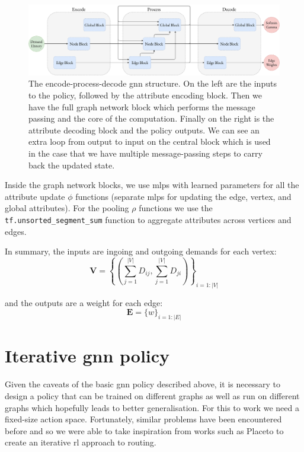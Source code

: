 \begin{figure}
    \centering
    \includegraphics[width=\textwidth]{figures/encode_process_decode.pdf}
    \caption{The encode-process-decode \ac{gnn} structure. On the left are the inputs to the policy, followed by the attribute encoding block. Then we have the full graph network block which performs the message passing and the core of the computation. Finally on the right is the attribute decoding block and the policy outputs. We can see an extra loop from output to input on the central block which is used in the case that we have multiple message-passing steps to carry back the updated state.}
    \label{fig:encode_process_decode}
\end{figure}

Inside the graph network blocks, we use \acp{mlp} with learned parameters for all the attribute update $\phi$ functions (separate \acp{mlp} for updating the edge, vertex, and global attributes). For the pooling $\rho$ functions we use the \texttt{tf.unsorted\_segment\_sum} function to aggregate attributes across vertices and edges.

In summary, the inputs are ingoing and outgoing demands for each vertex:
\begin{equation}
  \label{equation:node_inputs}
  \bm{V} = \left\{\left(\sum_{j=1}^{|V|}{D_{ij}}, \sum_{j=1}^{|V|}{D_{ji}}\right)\right\}_{i=1:|V|}
\end{equation}

and the outputs are a weight for each edge:
\begin{equation}
  \label{equation:edge_outputs}
  \bm{E} = \{w\}_{i=1:|E|}
\end{equation}


\section{Iterative \ac{gnn} policy}
\label{section:gnn_iterative}
Given the caveats of the basic \ac{gnn} policy described above, it is necessary to design a policy that can be trained on different graphs as well as run on different graphs which hopefully leads to better generalisation. For this to work we need a fixed-size action space. Fortunately, similar problems have been encountered before and so we were able to take inspiration from works such as Placeto\cite{venkatakrishnan2019learning} to create an iterative \ac{rl} approach to routing.

